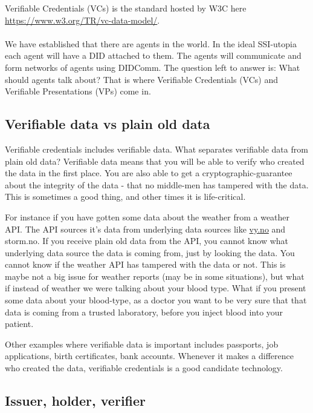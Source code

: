 Verifiable Credentials (VCs) is the standard hosted by W3C here \url{https://www.w3.org/TR/vc-data-model/}.

\paragraph{}

We have established that there are agents in the world. In the ideal
SSI-utopia each agent will have a DID attached to them. The agents will
communicate and form networks of agents using DIDComm. The question left
to answer is: What should agents talk about? That is where Verifiable
Credentials (VCs) and Verifiable Presentations (VPs) come in.



\subsection{Verifiable data vs plain old data}

Verifiable credentials includes verifiable data. What separates verifiable data from plain old
data? Verifiable data means that you will be able to verify who created
the data in the first place. You are also able to get a
cryptographic-guarantee about the integrity of the data - that no
middle-men has tampered with the data. This is sometimes a good thing,
and other times it is life-critical.

For instance if you have gotten some data about the weather from a
weather API. The API sources it's data from underlying data sources like
\href{http://vy.no}{vy.no} and storm.no. If you receive plain old data
from the API, you cannot know what underlying data source the data is
coming from, just by looking the data. You cannot know if the weather
API has tampered with the data or not. This is maybe not a big issue for
weather reports (may be in some situations), but what if instead of
weather we were talking about your blood type. What if you present some
data about your blood-type, as a doctor you want to be very sure that
that data is coming from a trusted laboratory, before you inject blood
into your patient.

Other examples where verifiable data is important includes passports,
job applications, birth certificates, bank accounts. Whenever it
makes a difference who created the data, verifiable credentials is a
good candidate technology.


\subsection{Issuer, holder, verifier}

